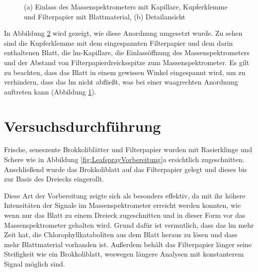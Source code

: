 \begin{figure}[htbp]
\begin{subfigure}[b]{0.5\textwidth}
    \caption{}
    \label{fig:MSLeafsprayDetail2}
  \end{subfigure}
  \caption[MS-Leafspray Versuchsaufbau Detailfotos, Quelle: Autor]{(a) Einlass des Massenspektrometers mit Kapillare, Kupferklemme und Filterpapier mit Blattmaterial, (b) Detailansicht}
  \label{fig:MSLeafsprayDetail}
\end{figure}

In Abbildung \ref{fig:MSLeafsprayDetail} wird gezeigt, wie diese Anordnung umgesetzt wurde. Zu sehen sind die Kupferklemme mit dem eingespannten Filterpapier und dem darin enthaltenen Blatt, die \gls{lm}-Kapillare, die Einlassöffnung des Massenspektrometers und der Abstand von Filterpapierdreicksspitze zum Massenspektrometer. Es gilt zu beachten, dass das Blatt in einem gewissen Winkel eingespannt wird, um zu verhindern, dass das \gls{lm} nicht abfließt, was bei einer waagrechten Anordnung auftreten kann (Abbildung \ref{fig:MSLeafsprayDetail2}). 

\section{Versuchsdurchführung} \label{sec:Versuchsdurchfuehrung}

Frische, seneszente Brokkoliblätter und Filterpapier wurden mit Rasierklinge und Schere wie in Abbildung \ref{fig:LeafsprayVorbereitung}a ersichtlich zugeschnitten. Anschließend wurde das Brokkoliblatt auf das Filterpapier gelegt und dieses bis zur Basis des Dreiecks eingerollt. 

Diese Art der Vorbereitung zeigte sich als besonders effektiv, da mit ihr höhere Intensitäten der Signale im Massenspektrometer erreicht werden konnten, wie wenn nur das Blatt zu einem Dreieck zugeschnitten und in dieser Form vor das Massenspektrometer gehalten wird. Grund dafür ist vermutlich, dass das \gls{lm} mehr Zeit hat, die Chlorophyllkataboliten aus dem Blatt heraus zu lösen und dass mehr Blattmaterial vorhanden ist. Außerdem behält das Filterpapier länger seine Steifigkeit wie ein Brokkoliblatt, weswegen längere Analysen mit konstanterem Signal möglich sind.

